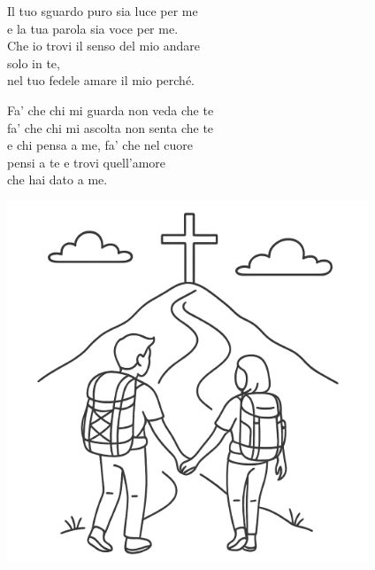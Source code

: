 	\begin{mystrofe}
		Il tuo sguardo puro sia luce per me \\
		e la tua parola sia voce per me. \\
		Che io trovi il senso del mio andare \\
		solo in te, \\
		nel tuo fedele amare il mio perché. \\
	\end{mystrofe}

	\begin{mystrofe}
		\ritornello{}
	\end{mystrofe}

	\begin{mystrofe}
		Fa' che chi mi guarda non veda che te \\
		fa' che chi mi ascolta non senta che te \\
		e chi pensa a me, fa' che nel cuore \\
		pensi a te e trovi quell'amore \\
		che hai dato a me. \\
	\end{mystrofe}

	\begin{mystrofe}
		\ritornello{}
	\end{mystrofe}

\vfill
\begin{center}
\includegraphics[width=\textwidth]{src/assets/img/fine.png}
\end{center}
\vfill